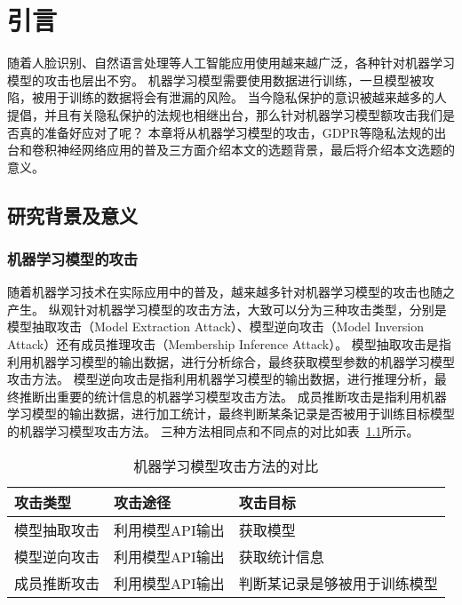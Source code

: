 
\chapter{引言}

随着人脸识别、自然语言处理等人工智能应用使用越来越广泛，各种针对机器学习模型的攻击也层出不穷。
机器学习模型需要使用数据进行训练，一旦模型被攻陷，被用于训练的数据将会有泄漏的风险。
当今隐私保护的意识被越来越多的人提倡，并且有关隐私保护的法规也相继出台，那么针对机器学习模型额攻击我们是否真的准备好应对了呢？
本章将从机器学习模型的攻击，GDPR等隐私法规的出台和卷积神经网络应用的普及三方面介绍本文的选题背景，最后将介绍本文选题的意义。

\section{研究背景及意义}

\subsection{机器学习模型的攻击}
随着机器学习技术在实际应用中的普及，越来越多针对机器学习模型的攻击也随之产生。
纵观针对机器学习模型的攻击方法，大致可以分为三种攻击类型，分别是模型抽取攻击（Model Extraction Attack）、模型逆向攻击（Model Inversion Attack）还有成员推理攻击（Membership Inference Attack）。
模型抽取攻击是指利用机器学习模型的输出数据，进行分析综合，最终获取模型参数的机器学习模型攻击方法。
模型逆向攻击是指利用机器学习模型的输出数据，进行推理分析，最终推断出重要的统计信息的机器学习模型攻击方法。
成员推断攻击是指利用机器学习模型的输出数据，进行加工统计，最终判断某条记录是否被用于训练目标模型的机器学习模型攻击方法。
三种方法相同点和不同点的对比如表~\ref{tab:model-attack-difference}所示。
\begin{table}
    \centering
    \caption{机器学习模型攻击方法的对比}
    \begin{tabular}{lll}
      \toprule
      攻击类型  & 攻击途径 & 攻击目标  \\
      \midrule
      模型抽取攻击   & 利用模型API输出 & 获取模型 \\
      模型逆向攻击   & 利用模型API输出 & 获取统计信息                    \\
      成员推断攻击 & 利用模型API输出  & 判断某记录是够被用于训练模型  \\
      \bottomrule
    \end{tabular}
    \label{tab:model-attack-difference}
\end{table}

